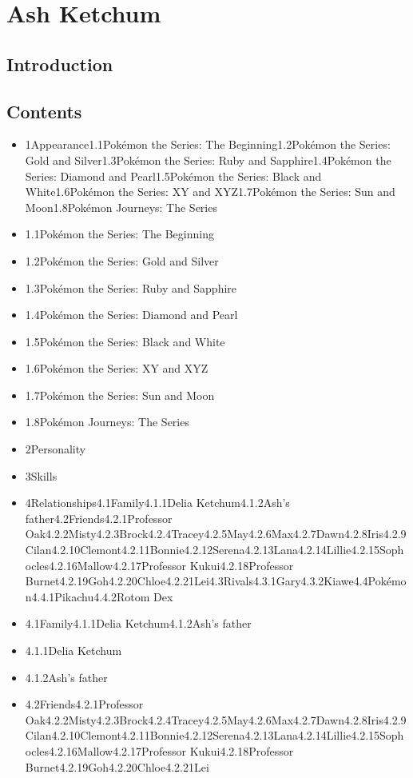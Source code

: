 \documentclass[a4paper,12pt]{article}
\begin{document}
\section*{ Ash Ketchum}

\subsection*{Introduction}\n\n\subsection*{Contents}\n\n\begin{itemize}
\item 1Appearance1.1Pokémon the Series: The Beginning1.2Pokémon the Series: Gold and Silver1.3Pokémon the Series: Ruby and Sapphire1.4Pokémon the Series: Diamond and Pearl1.5Pokémon the Series: Black and White1.6Pokémon the Series: XY and XYZ1.7Pokémon the Series: Sun and Moon1.8Pokémon Journeys: The Series
\item 1.1Pokémon the Series: The Beginning
\item 1.2Pokémon the Series: Gold and Silver
\item 1.3Pokémon the Series: Ruby and Sapphire
\item 1.4Pokémon the Series: Diamond and Pearl
\item 1.5Pokémon the Series: Black and White
\item 1.6Pokémon the Series: XY and XYZ
\item 1.7Pokémon the Series: Sun and Moon
\item 1.8Pokémon Journeys: The Series
\item 2Personality
\item 3Skills
\item 4Relationships4.1Family4.1.1Delia Ketchum4.1.2Ash's father4.2Friends4.2.1Professor Oak4.2.2Misty4.2.3Brock4.2.4Tracey4.2.5May4.2.6Max4.2.7Dawn4.2.8Iris4.2.9Cilan4.2.10Clemont4.2.11Bonnie4.2.12Serena4.2.13Lana4.2.14Lillie4.2.15Sophocles4.2.16Mallow4.2.17Professor Kukui4.2.18Professor Burnet4.2.19Goh4.2.20Chloe4.2.21Lei4.3Rivals4.3.1Gary4.3.2Kiawe4.4Pokémon4.4.1Pikachu4.4.2Rotom Dex
\item 4.1Family4.1.1Delia Ketchum4.1.2Ash's father
\item 4.1.1Delia Ketchum
\item 4.1.2Ash's father
\item 4.2Friends4.2.1Professor Oak4.2.2Misty4.2.3Brock4.2.4Tracey4.2.5May4.2.6Max4.2.7Dawn4.2.8Iris4.2.9Cilan4.2.10Clemont4.2.11Bonnie4.2.12Serena4.2.13Lana4.2.14Lillie4.2.15Sophocles4.2.16Mallow4.2.17Professor Kukui4.2.18Professor Burnet4.2.19Goh4.2.20Chloe4.2.21Lei

\end{itemize}
\end{document}
